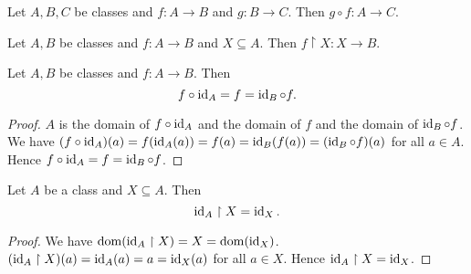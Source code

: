 \documentclass[../../set-theory/set-theory.tex]{subfiles}
\begin{document}
  \begin{forthel}
    \begin{proposition}
      Let $A, B, C$ be classes and $f : A \to B$ and $g : B \to C$.
      Then $g \circ f : A \to C$.
    \end{proposition}
  \end{forthel}

  \begin{forthel}
    \begin{proposition}
      Let $A, B$ be classes and $f : A \to B$ and $X \subseteq A$.
      Then $f \restriction X : X \to B$.
    \end{proposition}
  \end{forthel}

  \begin{forthel}
    \begin{proposition}
      Let $A, B$ be classes and $f : A \to B$.
      Then \[ f \circ \operatorname{id}_{A} = f = \operatorname{id}_{B} \circ f. \]
    \end{proposition}
    \begin{proof}
      $A$ is the domain of $f \circ \operatorname{id}_{A}$ and the domain of $f$ and the
      domain of $\operatorname{id}_{B} \circ f$.
      We have $(f \circ \operatorname{id}_{A})(a)
        = f(\operatorname{id}_{A}(a))
        = f(a)
        = \operatorname{id}_{B}(f(a))
        = (\operatorname{id}_{B} \circ f)(a)$
      for all $a \in A$.
      Hence $f \circ \operatorname{id}_{A}
        = f
        = \operatorname{id}_{B} \circ f$.
    \end{proof}
  \end{forthel}

  \begin{forthel}
    \begin{proposition}
      Let $A$ be a class and $X \subseteq A$.
      Then \[ \operatorname{id}_{A} \restriction X = \operatorname{id}_{X}. \]
    \end{proposition}
    \begin{proof}
      We have $\operatorname{dom}(\operatorname{id}_{A} \restriction X)
        = X
        = \operatorname{dom}(\operatorname{id}_{X})$.
      $(\operatorname{id}_{A} \restriction X)(a)
        = \operatorname{id}_{A}(a)
        = a
        = \operatorname{id}_{X}(a)$
      for all $a \in X$.
      Hence $\operatorname{id}_{A} \restriction X = \operatorname{id}_{X}$.
    \end{proof}
  \end{forthel}
\end{document}
